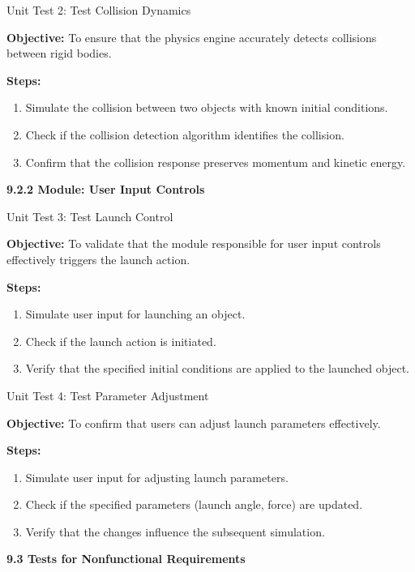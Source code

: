 \documentclass[
]{article}
\begin{document}
Unit Test 2: Test Collision Dynamics

\textbf{Objective:} To ensure that the physics engine accurately detects
collisions between rigid bodies.

\textbf{Steps:}

\begin{enumerate}
\def\labelenumi{\arabic{enumi}.}
\item
  Simulate the collision between two objects with known initial
  conditions.
\item
  Check if the collision detection algorithm identifies the collision.
\item
  Confirm that the collision response preserves momentum and kinetic
  energy.
\end{enumerate}

\protect\hypertarget{Ao4}{}{}\textbf{9.2.2 Module: User Input Controls}

Unit Test 3: Test Launch Control

\textbf{Objective:} To validate that the module responsible for user
input controls effectively triggers the launch action.

\textbf{Steps:}

\begin{enumerate}
\def\labelenumi{\arabic{enumi}.}
\item
  Simulate user input for launching an object.
\item
  Check if the launch action is initiated.
\item
  Verify that the specified initial conditions are applied to the
  launched object.
\end{enumerate}

Unit Test 4: Test Parameter Adjustment

\textbf{Objective:} To confirm that users can adjust launch parameters
effectively.

\textbf{Steps:}

\begin{enumerate}
\def\labelenumi{\arabic{enumi}.}
\item
  Simulate user input for adjusting launch parameters.
\item
  Check if the specified parameters (launch angle, force) are updated.
\item
  Verify that the changes influence the subsequent simulation.
\end{enumerate}

\protect\hypertarget{Ao5}{}{}\textbf{9.3 Tests for Nonfunctional
Requirements}
\end{document}
